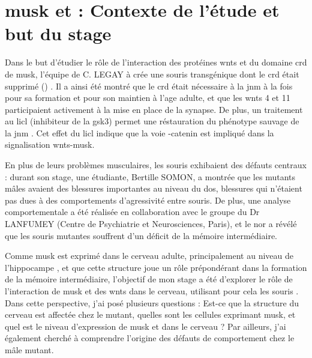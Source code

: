 \section{\acrshort{musk} et  : Contexte de l'étude et but du stage}
\label{sec:Contexte}	
	Dans le but d'étudier le rôle de l'interaction des protéines \Glspl{wnt} et du domaine \gls{crd} de \gls{musk}, l'équipe de C. LEGAY à crée une souris transgénique dont le \gls{crd} était supprimé (\mcrd) \cite{Messeant2015, Messeant2017}. Il a ainsi été montré que le \gls{crd} était nécessaire à la \gls{jnm} à la fois pour sa formation et pour son maintien à l'age adulte, et que les \Glspl{wnt} 4 et 11 participaient activement à la mise en place de la synapse. De plus, un traitement au \gls{licl} (inhibiteur de la \gls{gsk3}) permet une réstauration du phénotype sauvage de la \gls{jnm} \cite{Messeant2015}. Cet effet du \gls{licl} indique que la voie \textbeta{}-catenin est impliqué dans la signalisation \Glspl{wnt}-\gls{musk}. %
	
	En plus de leurs problèmes musculaires, les souris \mcrd exhibaient des défauts centraux : durant son stage, une étudiante, Bertille SOMON, a montrée que les mutants mâles avaient des blessures importantes au niveau du dos, blessures qui n'étaient pas dues à des comportements d'agressivité entre souris. De plus, une analyse comportementale a été réalisée en collaboration avec le groupe du Dr LANFUMEY (Centre de Psychiatrie et Neurosciences, Paris), et le \gls{nor} a révélé que les souris mutantes souffrent d'un déficit de la mémoire intermédiaire.
	
	Comme \gls{musk} est exprimé dans le cerveau adulte, principalement au niveau de l'hippocampe \cite{Garcia-Osta2006}, et que cette structure joue un rôle prépondérant dans la formation de la mémoire intermédiaire, l'objectif de mon stage a été d'explorer le rôle de l'interaction de \gls{musk} et des \Glspl{wnt} dans le cerveau, utilisant pour cela les souris \mcrd. Dans cette perspective, j'ai posé plusieurs questions : Est-ce que la structure du cerveau est affectée chez le mutant, quelles sont les cellules exprimant \gls{musk}, et quel est le niveau d'expression de \gls{musk} et \mcrd dans le cerveau ? Par ailleurs, j'ai également cherché à comprendre l'origine des défauts de comportement chez le mâle mutant.
	
